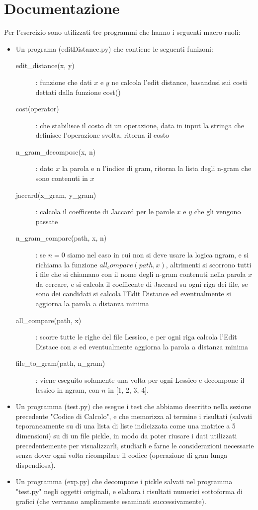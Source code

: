 \documentclass{article}
\begin{document}
\section{Documentazione}
Per l’esercizio sono utilizzati tre programmi che hanno i seguenti macro-ruoli:
\begin{itemize}
\item Un programa (editDistance.py) che contiene le seguenti funizoni:
\begin{description}
\item[edit\_distance(x, y)]: funzione che dati $x$ e $y$ ne calcola l'edit distance, basandosi sui costi dettati dalla funzione cost()
\item[cost(operator)]: che stabilisce il costo di un operazione, data in input la stringa che definisce l'operazione svolta, ritorna il costo
\item[n\_gram\_decompose(x, n)]: dato $x$ la parola e n l'indice di gram, ritorna la lista degli n-gram che sono contenuti in $x$
\item[jaccard(x\_gram, y\_gram)]: calcola il coefficente di Jaccard per le parole $x$ e $y$ che gli vengono passate
\item[n\_gram\_compare(path, x, n)]: se $n = 0$ siamo nel caso in cui non si deve usare la logica n\-gram, e si richiama la funzione $all_compare(path, x)$, altrimenti si scorrono tutti i file che si chiamano con il nome degli n-gram contenuti nella parola $x$ da cercare, e si calcola il coefficente di Jaccard su ogni riga dei file, se sono dei candidati si calcola l'Edit Distance ed eventualmente si aggiorna la parola a distanza minima
\item[all\_compare(path, x)]: scorre tutte le righe del file Lessico, e per ogni riga calcola l'Edit Distace con $x$ ed eventualmente aggiorna la parola a distanza minima
\item[file\_to\_gram(path, n\_gram)]: viene eseguito solamente una volta per ogni Lessico e decompone il lessico in n\-gram, con $n$ in [1, 2, 3, 4]. 
\end{description}

\item Un programma (test.py) che esegue i test che abbiamo descritto nella sezione precedente "Codice di Calcolo", e che memorizza al termine i risultati (salvati teporaneamente su di una lista di liste indicizzata come una matrice a 5 dimensioni) su di un file pickle, in modo da poter riusare i dati utilizzati precedentemente per visualizzarli, studiarli e farne le considerazioni necessarie senza dover ogni volta ricompilare il codice (operazione di gran lunga dispendiosa).

\item Un programma (exp.py) che decompone i pickle salvati nel programma "test.py" negli oggetti originali, e elabora i risultati numerici sottoforma di grafici (che verranno ampliamente esaminati successivamente).
\end{itemize}
 
\end{document}
